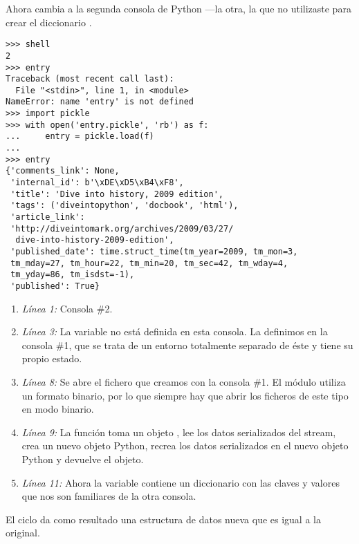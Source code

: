 Ahora cambia a la segunda consola de Python ---la otra, la que no utilizaste para crear el diccionario .

\noindent\begin{minipage}{\textwidth}
\begin{lstlisting}[mathescape=True]
>>> shell
2
>>> entry
Traceback (most recent call last):
  File "<stdin>", line 1, in <module>
NameError: name 'entry' is not defined
>>> import pickle
>>> with open('entry.pickle', 'rb') as f:
...     entry = pickle.load(f)
... 
>>> entry
{'comments_link': None,
 'internal_id': b'\xDE\xD5\xB4\xF8',
 'title': 'Dive into history, 2009 edition',
 'tags': ('diveintopython', 'docbook', 'html'),
 'article_link':
 'http://diveintomark.org/archives/2009/03/27/
  dive-into-history-2009-edition',
 'published_date': time.struct_time(tm_year=2009, tm_mon=3, 
 tm_mday=27, tm_hour=22, tm_min=20, tm_sec=42, tm_wday=4, 
 tm_yday=86, tm_isdst=-1),
 'published': True}
\end{lstlisting}
\end{minipage}

\begin{enumerate}

\item \emph{Línea 1:} Consola \#2.

\item \emph{Línea 3:} La variable  no está definida en esta consola. La definimos en la consola \#1, que se trata de un entorno totalmente separado de éste y tiene su propio estado.

\item \emph{Línea 8:} Se abre el fichero  que creamos con la consola \#1. El módulo  utiliza un formato binario, por lo que siempre hay que abrir los ficheros de este tipo en modo binario.

\item \emph{Línea 9:} La función  toma un objeto , lee los datos serializados del stream, crea un nuevo objeto Python, recrea los datos serializados en el nuevo objeto Python y devuelve el objeto.

\item \emph{Línea 11:} Ahora la variable  contiene un diccionario con las claves y valores que nos son familiares de la otra consola.

\end{enumerate}

El ciclo  da como resultado una estructura de datos nueva que es igual a la original.


